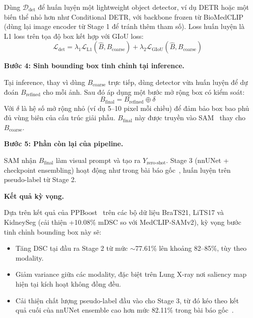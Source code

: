 \documentclass[conference]{IEEEtran}
\begin{document}
Dùng $\mathcal{D}_{\mathrm{det}}$ để huấn luyện một lightweight object detector, ví dụ DETR hoặc một biến thể nhỏ hơn như Conditional DETR, với backbone frozen từ BioMedCLIP~\cite{ref3} (dùng lại image encoder từ Stage 1 để tránh thêm tham số). Loss huấn luyện là L1 loss trên tọa độ box kết hợp với GIoU loss:
\begin{equation}
\mathcal{L}_{\mathrm{det}} = \lambda_1 \mathcal{L}_{\mathrm{L1}}(\hat{B}, B_{\mathrm{coarse}}) + \lambda_2 \mathcal{L}_{\mathrm{GIoU}}(\hat{B}, B_{\mathrm{coarse}})
\label{eq:det-loss}
\end{equation}

\textbf{Bước 4: Sinh bounding box tinh chỉnh tại inference.}

Tại inference, thay vì dùng $B_{\mathrm{coarse}}$ trực tiếp, dùng detector vừa huấn luyện để dự đoán $B_{\mathrm{refined}}$ cho mỗi ảnh. Sau đó áp dụng một bước mở rộng box có kiểm soát:
\begin{equation}
B_{\mathrm{final}} = B_{\mathrm{refined}} \oplus \delta
\label{eq:box-expand}
\end{equation}
Với $\delta$ là hệ số mở rộng nhỏ (ví dụ 5--10 pixel mỗi chiều) để đảm bảo box bao phủ đủ vùng biên của cấu trúc giải phẫu. $B_{\mathrm{final}}$ này được truyền vào SAM~\cite{ref2,ref4} thay cho $B_{\mathrm{coarse}}$.

\textbf{Bước 5: Phần còn lại của pipeline.}

SAM nhận $B_{\mathrm{final}}$ làm visual prompt và tạo ra $Y_{\text{zero-shot}}$. Stage 3 (nnUNet + checkpoint ensembling) hoạt động như trong bài báo gốc~\cite{ref1}, huấn luyện trên pseudo-label từ Stage 2.

\textbf{Kết quả kỳ vọng.}

Dựa trên kết quả của PPBoost~\cite{ref8} trên các bộ dữ liệu BraTS21, LiTS17 và KidneySeg (cải thiện +10.08\% mDSC so với MedCLIP-SAMv2), kỳ vọng bước tinh chỉnh bounding box này sẽ:
\begin{itemize}
    \item Tăng DSC tại đầu ra Stage 2 từ mức $\sim$77.61\% lên khoảng 82--85\%, tùy theo modality.
    \item Giảm variance giữa các modality, đặc biệt trên Lung X-ray nơi saliency map hiện tại kích hoạt không đồng đều.
    \item Cải thiện chất lượng pseudo-label đầu vào cho Stage 3, từ đó kéo theo kết quả cuối của nnUNet ensemble cao hơn mức 82.11\% trong bài báo gốc~\cite{ref1}.
\end{itemize}
\end{document}
